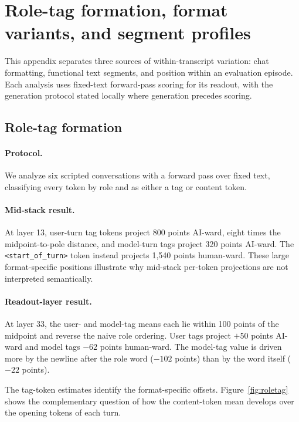 \FloatBarrier

\section{Role-tag formation, format variants, and segment profiles}
\label{app:roletag}

This appendix separates three sources of within-transcript variation: chat
formatting, functional text segments, and position within an evaluation episode.
Each analysis uses fixed-text forward-pass scoring for its readout, with the
generation protocol stated locally where generation precedes scoring.

\subsection{Role-tag formation}

\paragraph{Protocol.}
We analyze six scripted conversations with a forward pass over fixed text,
classifying every token by role and as either a tag or content token.

\paragraph{Mid-stack result.}
At layer 13, user-turn tag tokens project 800 points AI-ward, eight times the
midpoint-to-pole distance, and model-turn tags project 320 points AI-ward. The
\texttt{\textless start\_of\_turn\textgreater} token instead projects 1,540
points human-ward. These large format-specific positions illustrate why
mid-stack per-token projections are not interpreted semantically.

\paragraph{Readout-layer result.}
At layer 33, the user- and model-tag means each lie within 100 points of the
midpoint and reverse the naive role ordering. User tags project $+50$ points
AI-ward and model tags $-62$ points human-ward. The model-tag value is driven
more by the newline after the role word ($-102$ points) than by the word itself
($-22$ points).

The tag-token estimates identify the format-specific offsets.
Figure~\ref{fig:roletag} shows the complementary question of how the
content-token mean develops over the opening tokens of each turn.

